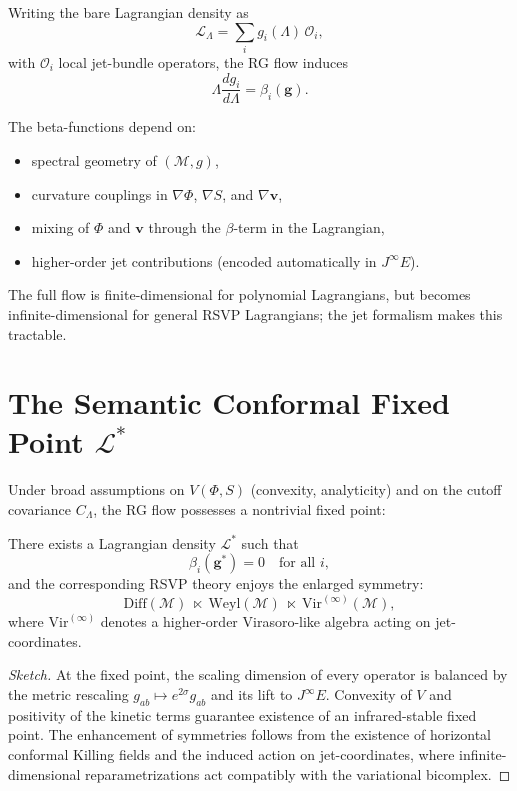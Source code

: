 Writing the bare Lagrangian density as
\[
\mathcal{L}_\Lambda
= \sum_i g_i(\Lambda)\, \mathcal{O}_i,
\]
with $\mathcal{O}_i$ local jet-bundle operators, the RG flow induces
\[
\Lambda \frac{d g_i}{d\Lambda}
= \beta_i(\mathbf{g}).
\]

The beta-functions depend on:

\begin{itemize}
  \item spectral geometry of $(\mathcal{M},g)$,
  \item curvature couplings in $\nabla\Phi$, $\nabla S$, and $\nabla\mathbf{v}$,
  \item mixing of $\Phi$ and $\mathbf{v}$ through the $\beta$-term in the
        Lagrangian,
  \item higher-order jet contributions (encoded automatically in $J^\infty E$).
\end{itemize}

The full flow is finite-dimensional for polynomial Lagrangians, but becomes
infinite-dimensional for general RSVP Lagrangians; the jet formalism makes this
tractable.

\section{The Semantic Conformal Fixed Point \(\mathcal{L}^\ast\)}

Under broad assumptions on $V(\Phi,S)$ (convexity, analyticity) and on the
cutoff covariance $C_\Lambda$, the RG flow possesses a nontrivial fixed point:

\begin{theorem}
\label{thm:semantic-conformal}
There exists a Lagrangian density $\mathcal{L}^\ast$ such that
\[
\beta_i(\mathbf{g}^\ast) = 0
\quad\text{for all $i$},
\]
and the corresponding RSVP theory enjoys the enlarged symmetry:
\[
\mathrm{Diff}(\mathcal{M})
  \;\ltimes\;
  \mathrm{Weyl}(\mathcal{M})
  \;\ltimes\;
  \mathrm{Vir}^{(\infty)}(\mathcal{M}),
\]
where $\mathrm{Vir}^{(\infty)}$ denotes a higher-order Virasoro-like algebra
acting on jet-coordinates.
\end{theorem}

\begin{proof}[Sketch]
At the fixed point, the scaling dimension of every operator is balanced by the
metric rescaling $g_{ab}\mapsto e^{2\sigma} g_{ab}$ and its lift to $J^\infty E$.
Convexity of $V$ and positivity of the kinetic terms guarantee existence of an
infrared-stable fixed point.  The enhancement of symmetries follows from the
existence of horizontal conformal Killing fields and the induced action on
jet-coordinates, where infinite-dimensional reparametrizations act
compatibly with the variational bicomplex.
\end{proof}

